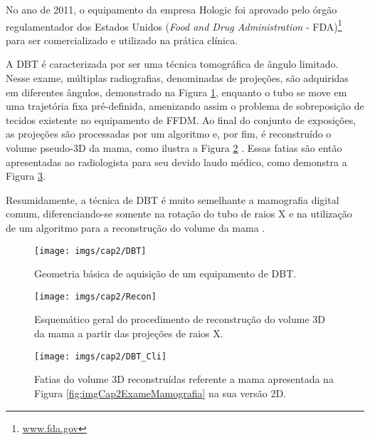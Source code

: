 No ano de 2011, o equipamento da empresa Hologic foi aprovado pelo órgão regulamentador dos Estados Unidos (\textit{Food and Drug Administration} - \acs{FDA})\footnote{\url{www.fda.gov}} para ser comercializado e utilizado na prática clínica. 

A \acs{DBT} é caracterizada por ser uma técnica tomográfica de ângulo limitado. Nesse exame, múltiplas radiografias, denominadas de projeções, são adquiridas em diferentes ângulos, demonstrado na Figura \ref{fig:imgCap2DBTEstrutura}, enquanto o tubo se move em uma trajetória fixa pré-definida, amenizando assim o problema de sobreposição de tecidos existente no equipamento de \acs{FFDM}. Ao final do conjunto de exposições, as projeções são processadas por um algoritmo e, por fim, é reconstruído o volume pseudo-\acs{3D} da mama, como ilustra a Figura \ref{fig:imgCap2ExameDBTRecon} \cite{vedantham2015digital,michell2018role}. Essas fatias são então apresentadas ao radiologista para seu devido laudo médico, como demonstra a Figura \ref{fig:imgCap2ExameDBT}. 

Resumidamente, a técnica de \acs{DBT} é muito semelhante a mamografia digital comum,  diferenciando-se somente na rotação do tubo de raios X e na utilização de um algoritmo para a reconstrução do volume da mama \cite{michell2018role}.

\begin{figure}[htb]
	\caption{Geometria básica de aquisição de um equipamento de \acs{DBT}.}
	\begin{center}
		\texttt{[image: imgs/cap2/DBT]}
	\end{center}
	\label{fig:imgCap2DBTEstrutura}
\end{figure}


\begin{figure}[htb]
	\caption{Esquemático geral do procedimento de reconstrução do volume \acs{3D} da mama a partir das projeções de raios X.}
	\begin{center}
		\texttt{[image: imgs/cap2/Recon]}
	\end{center}
	\label{fig:imgCap2ExameDBTRecon}
\end{figure}

\begin{figure}[htb]
	\caption{Fatias do volume \acs{3D} reconstruídas referente a mama apresentada na Figura \ref{fig:imgCap2ExameMamografia} na sua versão \acs{2D}.}
	\begin{center}
		\texttt{[image: imgs/cap2/DBT\_Cli]}
	\end{center}
	\label{fig:imgCap2ExameDBT}
\end{figure}


